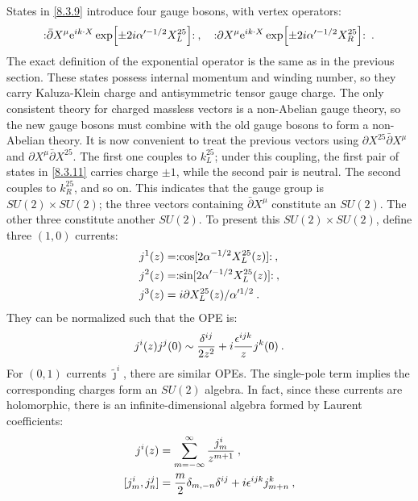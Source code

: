States in \eqref{8.3.9} introduce four gauge bosons, with vertex operators:
\begin{equation}
	: \mathrel{\bar{\partial} X^{\mu} \mathrm{e}^{i k \cdot X} \exp [\pm 2 i \alpha^{\prime-1 / 2} X_{L}^{25}]}: \:, \quad 
	: \mathrel{ \partial X^{\mu} \mathrm{e}^{i k \cdot X} \exp [\pm 2 i \alpha^{\prime-1 / 2} X_{R}^{25}]}: \:. \label{8.3.11}
\end{equation}
The exact definition of the exponential operator is the same as in the previous section. These states possess internal momentum and winding number, so they carry Kaluza-Klein charge and antisymmetric tensor gauge charge. The only consistent theory for charged massless vectors is a non-Abelian gauge theory, 
so the new gauge bosons must combine with the old gauge bosons to form a non-Abelian theory. It is now convenient to treat the previous vectors using $\partial X^{25} \bar{\partial} X^{\mu}$ and $\partial X^{\mu} \bar{\partial} X^{25}$. 
The first one couples to $k_{L}^{25}$; under this coupling, the first pair of states in \eqref{8.3.11} carries charge $\pm 1$, while the second pair is neutral. 
The second couples to $k_{R}^{25}$, and so on.
This indicates that the gauge group is $S U(2) \times S U(2)$; the three vectors containing $\bar{\partial} X^{\mu}$ constitute an $S U(2)$. 
The other three constitute another $S U(2)$.
To present this $S U(2) \times S U(2)$, define three $(1,0)$ currents:
\begin{subequations} \label{8.3.12}
	\begin{align}
		j^{1}(z)&=: \mathrel{\cos [2 \alpha^{-1 / 2} X_{L}^{25}(z)]}: \:, \label{8.3.12a}  \\
		j^{2}(z)&=:\mathrel{ \sin [2 \alpha^{\prime-1 / 2} X_{L}^{25}(z)]}: \:, \label{8.3.12b} \\
		j^{3}(z)&=i \partial X_{L}^{25}(z) / \alpha^{\prime 1 / 2} \:. \label{8.3.12c}
	\end{align}
\end{subequations}
They can be normalized such that the OPE is:
\begin{equation}
	j^{i}(z) j^{j}(0) \sim \frac{\delta^{i j}}{2 z^{2}}+ i \frac{\epsilon^{i j k}}{z} j^{k}(0) \:. \label{8.3.13}
\end{equation}
For $(0,1)$ currents $\tilde{\jmath}^{i} $, there are similar OPEs. 
The single-pole term implies the corresponding charges form an $SU(2)$ algebra. In fact, since these currents are holomorphic, there is an infinite-dimensional algebra formed by Laurent coefficients:
\begin{subequations} \label{8.3.14}
	\begin{align}
		j^{i}(z) &= \sum_{m=-\infty}^{\infty} \frac{j_{m}^{i}}{z^{m+1}}  \:, \label{8.3.14a} \\
		[j_{m}^{i}, j_{n}^{j}] &= \frac{m}{2} \delta_{m,-n} \delta^{i j}+ i \epsilon^{i j k} j_{m+n}^{k} \:, \label{8.3.14b} 
	\end{align}
\end{subequations}
